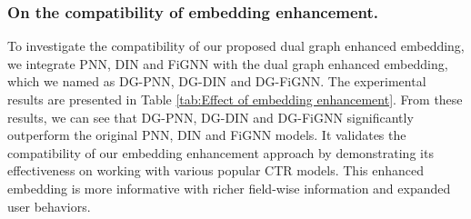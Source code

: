 \subsubsection{On the compatibility of embedding enhancement.}
To investigate the compatibility of our proposed dual graph enhanced embedding, we integrate PNN, DIN and FiGNN with the dual graph enhanced embedding, which we named as DG-PNN, DG-DIN and DG-FiGNN.
The experimental results are presented in Table \ref{tab:Effect of embedding enhancement}.
From these results, we can see that DG-PNN, DG-DIN and DG-FiGNN significantly outperform the original PNN, DIN and FiGNN models.
It validates the compatibility of our embedding enhancement approach by demonstrating its effectiveness on working with various popular CTR models.
This enhanced embedding is more informative with richer field-wise information and expanded user behaviors.

